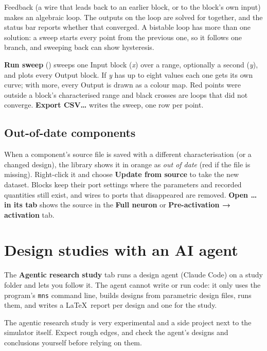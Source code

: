 \documentclass[11pt,a4paper]{article}
\newcommand{\code}[1]{\texttt{#1}}
\newcommand{\menu}[1]{\textsf{\textbf{#1}}}
\newcommand{\key}[1]{\fbox{\footnotesize\textsf{#1}}}
\begin{document}
Feedback (a wire that leads back to an earlier block, or to the block's own input) makes an algebraic loop. The
outputs on the loop are solved for together, and the status bar reports whether that converged. A bistable loop
has more than one solution: a sweep starts every point from the previous one, so it follows one branch, and
sweeping back can show hysteresis.

\menu{Run sweep} (\key{F6}) sweeps one Input block (\emph{x}) over a range, optionally a second (\emph{y}), and
plots every Output block. If \emph{y} has up to eight values each one gets its own curve; with more, every Output is
drawn as a colour map. Red points were outside a block's characterised range and black crosses are loops that did
not converge. \menu{Export CSV…} writes the sweep, one row per point.

\subsection*{Out-of-date components}
When a component's source file is saved with a different characterisation (or a changed design), the library
shows it in orange as \emph{out of date} (red if the file is missing). Right-click it and choose
\menu{Update from source} to take the new dataset. Blocks keep their port settings where the parameters and
recorded quantities still exist, and wires to ports that disappeared are removed. \menu{Open … in its tab} shows the
source in the \menu{Full neuron} or \menu{Pre-activation → activation} tab.

\section{Design studies with an AI agent}
\label{sec:study}

The \menu{Agentic research study} tab runs a design agent (Claude Code) on a study folder and lets you follow it. The agent
cannot write or run code: it only uses the program's \code{mns} command line, builds designs from parametric design
files, runs them, and writes a \LaTeX\ report per design and one for the study.

\begin{warn}
The agentic research study is very experimental and a side project next to the simulator itself. Expect rough edges, and check
the agent's designs and conclusions yourself before relying on them.
\end{warn}
\end{document}
